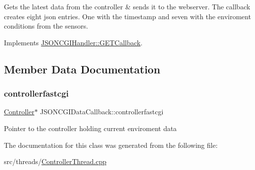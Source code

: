 Gets the latest data from the controller \& sends it to the webserver. The callback creates eight json entries. One with the timestamp and seven with the enviroment conditions from the sensors. 

Implements \hyperlink{classJSONCGIHandler_1_1GETCallback_a2367bf5a5912e9e5599ee464e0846255}{J\+S\+O\+N\+C\+G\+I\+Handler\+::\+G\+E\+T\+Callback}.



\subsection{Member Data Documentation}
\mbox{\label{classJSONCGIDataCallback_ac8684fae755ea1ba8e939e7fbed09c99}} 
\subsubsection{\texorpdfstring{controllerfastcgi}{controllerfastcgi}}
{\footnotesize\ttfamily \hyperlink{classController}{Controller}$\ast$ J\+S\+O\+N\+C\+G\+I\+Data\+Callback\+::controllerfastcgi\hspace{0.3cm}{\ttfamily [private]}}

Pointer to the controller holding current enviroment data 

The documentation for this class was generated from the following file\+:\begin{DoxyCompactItemize}
\item 
src/threads/\hyperlink{ControllerThread_8cpp}{Controller\+Thread.\+cpp}\end{DoxyCompactItemize}
